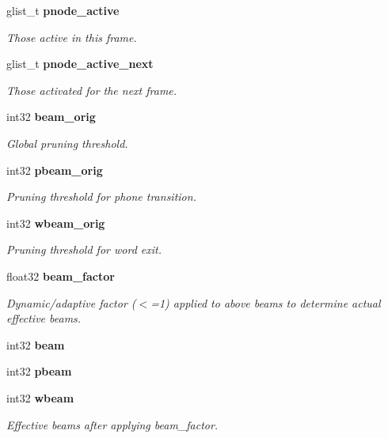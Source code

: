 \begin{DoxyCompactItemize}
glist\+\_\+t \textbf{ pnode\+\_\+active}
\begin{DoxyCompactList}\small\item\em Those active in this frame. \end{DoxyCompactList}\item 
\mbox{\label{structfsg__search__s_aa2dfc00e1f34041dacd9572b0d659775}} 
glist\+\_\+t \textbf{ pnode\+\_\+active\+\_\+next}
\begin{DoxyCompactList}\small\item\em Those activated for the next frame. \end{DoxyCompactList}\item 
\mbox{\label{structfsg__search__s_a0cdf7dc3d3eed0d37f46cb71fdea206e}} 
int32 \textbf{ beam\+\_\+orig}
\begin{DoxyCompactList}\small\item\em Global pruning threshold. \end{DoxyCompactList}\item 
\mbox{\label{structfsg__search__s_a7cdf0ab2591b95d89940d51e3ab01529}} 
int32 \textbf{ pbeam\+\_\+orig}
\begin{DoxyCompactList}\small\item\em Pruning threshold for phone transition. \end{DoxyCompactList}\item 
\mbox{\label{structfsg__search__s_a7f3ecc2f769143e42ed958744478db3c}} 
int32 \textbf{ wbeam\+\_\+orig}
\begin{DoxyCompactList}\small\item\em Pruning threshold for word exit. \end{DoxyCompactList}\item 
float32 \textbf{ beam\+\_\+factor}
\begin{DoxyCompactList}\small\item\em Dynamic/adaptive factor ($<$=1) applied to above beams to determine actual effective beams. \end{DoxyCompactList}\item 
\mbox{\label{structfsg__search__s_a1dbc28682f610fef5b79fd8a182f4395}} 
int32 {\bfseries beam}
\item 
\mbox{\label{structfsg__search__s_a373ffd62c4bcb07a6f28378ea33161e1}} 
int32 {\bfseries pbeam}
\item 
\mbox{\label{structfsg__search__s_af28ddecbb5115a50712c61f8a72dcf51}} 
int32 \textbf{ wbeam}
\begin{DoxyCompactList}\small\item\em Effective beams after applying beam\+\_\+factor. \end{DoxyCompactList}\item 

\end{DoxyCompactItemize}
